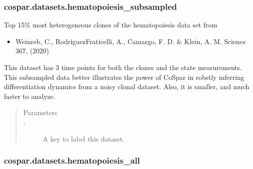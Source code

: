 \documentclass[letterpaper,10pt,english]{sphinxmanual}
\begin{document}
\subsubsection{cospar.datasets.hematopoiesis\_subsampled}
\label{\detokenize{cospar.datasets.hematopoiesis_subsampled:cospar-datasets-hematopoiesis-subsampled}}\label{\detokenize{cospar.datasets.hematopoiesis_subsampled::doc}}

\begin{fulllineitems}
\label{\detokenize{cospar.datasets.hematopoiesis_subsampled:cospar.datasets.hematopoiesis_subsampled}}
Top 15\% most heterogeneous clones of the hematopoiesis data set from
\begin{itemize}
\item {} 
Weinreb, C., Rodriguez\sphinxhyphen{}Fraticelli, A., Camargo, F. D. \& Klein, A. M. Science 367, (2020)

\end{itemize}

This dataset has 3 time points for both the clones and the state measurements.
This sub\sphinxhyphen{}sampled data better illustrates the power of CoSpar in robstly
inferring differentiation dynamics from a noisy clonal dataset. Also, it
is smaller, and much faster to analyze.
\begin{quote}\begin{description}
\item[{Parameters}] \leavevmode\item[{ : }] \leavevmode
A key to label this dataset.


\end{description}\end{quote}

\end{fulllineitems}



\subsubsection{cospar.datasets.hematopoiesis\_all}
\label{\detokenize{cospar.datasets.hematopoiesis_all:cospar-datasets-hematopoiesis-all}}\label{\detokenize{cospar.datasets.hematopoiesis_all::doc}}
\end{document}
